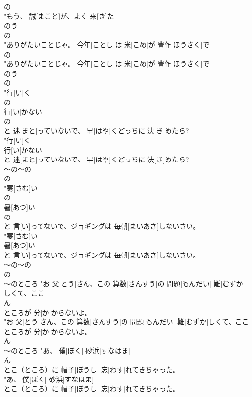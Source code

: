 \documentclass[8pt]{extreport}
\begin{document}
\begin{CJK}{UTF8}{min}
\\	の
\\	"もう、 誠[まこと]が、よく 来[き]た
\\	のう 
\\	の
\\	"ありがたいことじゃ。 今年[ことし]は 米[こめ]が 豊作[ほうさく]で
\\	の
\\	"ありがたいことじゃ。 今年[ことし]は 米[こめ]が 豊作[ほうさく]で
\\	のう 
\\	の
\\	"行[い]く
\\	の
\\	行[い]かない
\\	の
\\	と 迷[まと]っていないで、 早[はや]くどっちに 決[き]めたら?
\\	"行[い]く
\\	行[い]かない
\\	と 迷[まと]っていないで、 早[はや]くどっちに 決[き]めたら?
\\	～の～の	
\\	の
\\	"寒[さむ]い
\\	の
\\	暑[あつ]い
\\	の
\\	と 言[い]ってないで、ジョギングは 毎朝[まいあさ]しないさい。
\\	"寒[さむ]い
\\	暑[あつ]い
\\	と 言[い]ってないで、ジョギングは 毎朝[まいあさ]しないさい。
\\	～の～の	
\\	の
\\	～のところ	"お 父[とう]さん、この 算数[さんすう]の 問題[もんだい] 難[むずか]しくて、ここ
\\	ん
\\	ところが 分[か]からないよ。
\\	"お 父[とう]さん、この 算数[さんすう]の 問題[もんだい] 難[むずか]しくて、ここ
\\	ところが 分[か]からないよ。
\\	ん
\\	～のところ	"あ、 僕[ぼく] 砂浜[すなはま]
\\	ん
\\	とこ（ところ）に 帽子[ぼうし] 忘[わす]れてきちゃった。
\\	"あ、 僕[ぼく] 砂浜[すなはま]
\\	とこ（ところ）に 帽子[ぼうし] 忘[わす]れてきちゃった。

\end{CJK}
\end{document}
